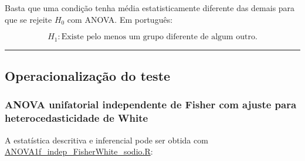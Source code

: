 \documentclass[]{article}
\begin{document}
Basta que uma condição tenha média estatisticamente diferente das demais
para que se rejeite \(H_0\) com ANOVA. Em português:

\[H_1: \text{Existe pelo menos um grupo diferente de algum outro.}\]

\begin{center}\rule{0.5\linewidth}{\linethickness}\end{center}

\subsection{Operacionalização do
teste}\label{operacionalizacao-do-teste}

\subsubsection{ANOVA unifatorial independente de Fisher com ajuste para
heterocedasticidade de
White}\label{anova-unifatorial-independente-de-fisher-com-ajuste-para-heterocedasticidade-de-white}

A estatística descritiva e inferencial pode ser obtida com
\url{ANOVA1f_indep_FisherWhite_sodio.R}:
\end{document}
